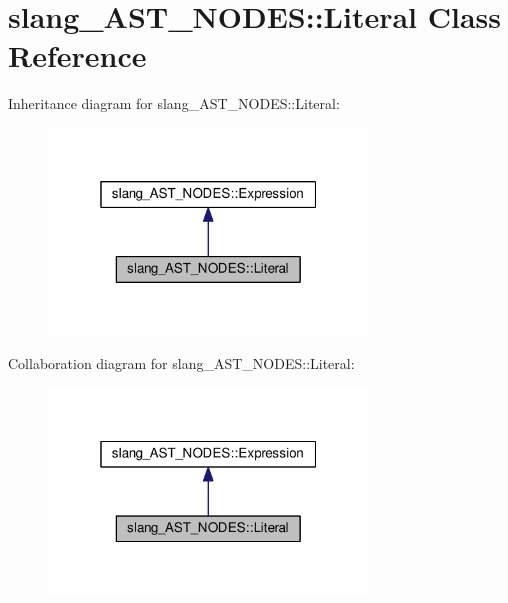 \hypertarget{classslang__AST__NODES_1_1Literal}{}\section{slang\+\_\+\+A\+S\+T\+\_\+\+N\+O\+D\+ES\+:\+:Literal Class Reference}
\label{classslang__AST__NODES_1_1Literal}


Inheritance diagram for slang\+\_\+\+A\+S\+T\+\_\+\+N\+O\+D\+ES\+:\+:Literal\+:
\nopagebreak
\begin{figure}[H]
\begin{center}
\leavevmode
\includegraphics[width=241pt]{classslang__AST__NODES_1_1Literal__inherit__graph}
\end{center}
\end{figure}


Collaboration diagram for slang\+\_\+\+A\+S\+T\+\_\+\+N\+O\+D\+ES\+:\+:Literal\+:
\nopagebreak
\begin{figure}[H]
\begin{center}
\leavevmode
\includegraphics[width=241pt]{classslang__AST__NODES_1_1Literal__coll__graph}
\end{center}
\end{figure}
